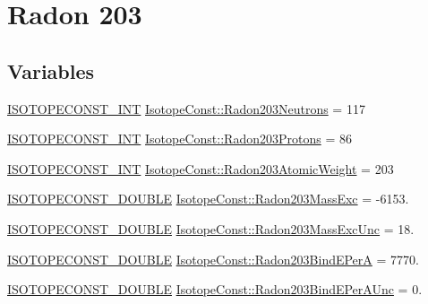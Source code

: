 \hypertarget{group___isotope_const-_radon-_rn203}{}\section{Radon 203}
\label{group___isotope_const-_radon-_rn203}
\subsection*{Variables}
\begin{DoxyCompactItemize}
\item 
\mbox{\hyperlink{group___isotope_const-_macros_ga5f18360b3e99483a35c32d789e62621c}{I\+S\+O\+T\+O\+P\+E\+C\+O\+N\+S\+T\+\_\+\+I\+NT}} \mbox{\hyperlink{group___isotope_const-_radon-_rn203_gaebd86f550606ac5d638b6c0ea6c5be7b}{Isotope\+Const\+::\+Radon203\+Neutrons}} = 117
\item 
\mbox{\hyperlink{group___isotope_const-_macros_ga5f18360b3e99483a35c32d789e62621c}{I\+S\+O\+T\+O\+P\+E\+C\+O\+N\+S\+T\+\_\+\+I\+NT}} \mbox{\hyperlink{group___isotope_const-_radon-_rn203_ga8d2f95b304db224e6f625ec0e5a0a532}{Isotope\+Const\+::\+Radon203\+Protons}} = 86
\item 
\mbox{\hyperlink{group___isotope_const-_macros_ga5f18360b3e99483a35c32d789e62621c}{I\+S\+O\+T\+O\+P\+E\+C\+O\+N\+S\+T\+\_\+\+I\+NT}} \mbox{\hyperlink{group___isotope_const-_radon-_rn203_ga4cfd0387dedb04b2076bee75f079926f}{Isotope\+Const\+::\+Radon203\+Atomic\+Weight}} = 203
\item 
\mbox{\hyperlink{group___isotope_const-_macros_ga8f45a7272ce02c0b4c65c44636ed719a}{I\+S\+O\+T\+O\+P\+E\+C\+O\+N\+S\+T\+\_\+\+D\+O\+U\+B\+LE}} \mbox{\hyperlink{group___isotope_const-_radon-_rn203_ga7285326ada3795422eff31ec1f877282}{Isotope\+Const\+::\+Radon203\+Mass\+Exc}} = -\/6153.
\item 
\mbox{\hyperlink{group___isotope_const-_macros_ga8f45a7272ce02c0b4c65c44636ed719a}{I\+S\+O\+T\+O\+P\+E\+C\+O\+N\+S\+T\+\_\+\+D\+O\+U\+B\+LE}} \mbox{\hyperlink{group___isotope_const-_radon-_rn203_ga54a72eea5c2369dc64e720265054cb14}{Isotope\+Const\+::\+Radon203\+Mass\+Exc\+Unc}} = 18.
\item 
\mbox{\hyperlink{group___isotope_const-_macros_ga8f45a7272ce02c0b4c65c44636ed719a}{I\+S\+O\+T\+O\+P\+E\+C\+O\+N\+S\+T\+\_\+\+D\+O\+U\+B\+LE}} \mbox{\hyperlink{group___isotope_const-_radon-_rn203_ga7fcdfca6e66d94b6bb041dddd16ee88c}{Isotope\+Const\+::\+Radon203\+Bind\+E\+PerA}} = 7770.
\item 
\mbox{\hyperlink{group___isotope_const-_macros_ga8f45a7272ce02c0b4c65c44636ed719a}{I\+S\+O\+T\+O\+P\+E\+C\+O\+N\+S\+T\+\_\+\+D\+O\+U\+B\+LE}} \mbox{\hyperlink{group___isotope_const-_radon-_rn203_gab13671fd8b9971713bc59136597b444e}{Isotope\+Const\+::\+Radon203\+Bind\+E\+Per\+A\+Unc}} = 0.

\end{DoxyCompactItemize}
